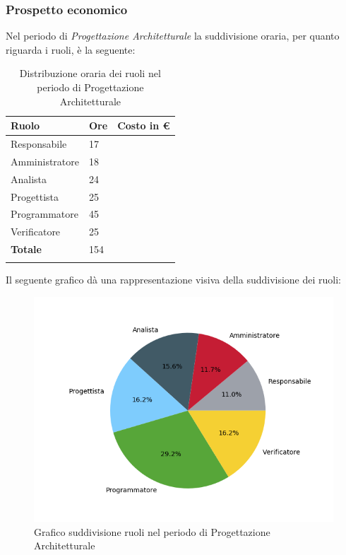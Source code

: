 \subsubsection{Prospetto economico}
Nel periodo di \textit{Progettazione Architetturale} la suddivisione oraria, per quanto riguarda i ruoli, è la seguente: 


\begin{longtable}{| C{.30\textwidth}| C{.15\textwidth}| C{.20\textwidth}|}
\hline
\textbf{Ruolo} & \textbf{Ore} & \textbf{Costo in \euro} \\
\hline 
Responsabile & 17 &  \\
\hline
Amministratore & 18 & \\
\hline
Analista & 24 &  \\
\hline
Progettista & 25 &  \\
\hline
Programmatore & 45 &  \\
\hline
Verificatore & 25 &  \\
\hline
\textbf{Totale} & 154 & \\ 
\hline

\caption{Distribuzione oraria dei ruoli nel periodo di Progettazione Architetturale}
\label{Distribuzione oraria del periodo di pa}
\end{longtable}

Il seguente grafico dà una rappresentazione visiva della suddivisione dei ruoli:
\begin{figure}[H]
	\centering
  		\includegraphics[width=1\linewidth]{./images/torta_pa.png}
  		\caption{Grafico suddivisione ruoli nel periodo di Progettazione Architetturale}
  		\label{fig:grafico suddivione ruoli pa}
\end{figure}


